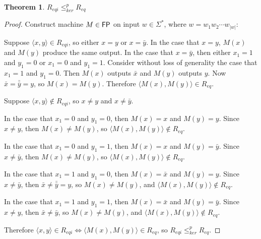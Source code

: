 \documentclass{article}
\newtheorem{theorem}{Theorem}[section]
\theoremstyle{definition} \newtheorem{definition}[definition]{Definition}
\newcommand{\sigmastar}{\Sigma^{*}} %
\newcommand{\kr}{\leq^{p}_{ker}} %
\newcommand{\pair}[2]{\langle#1,#2\rangle} %
\begin{document}
\begin{theorem}\label{thm:reqi_req}$R_{eqi}\kr R_{eq}$\end{theorem}
\begin{proof}
  Construct machine $M\in{\ensuremath{\mathsf{FP}}}$ on input $w\in\sigmastar$, where
  $w=w_1w_2\cdots w_{|w|}$:\\
  \begin{algorithm}[H]
  \end{algorithm}
  
  Suppose $\pair{x}{y}\in R_{eqi}$, so either $x=y$ or $x=\bar{y}$. In the case
  that $x=y$, $M(x)$ and $M(y)$ produce the same output. In the case that
  $x=\bar{y}$, then either $x_1=1$ and $y_1=0$ or $x_1=0$ and $y_1=1$. Consider
  without loss of generality the case that $x_1=1$ and $y_1=0$. Then $M(x)$
  outputs $\bar{x}$ and $M(y)$ outputs $y$. Now $\bar{x}=\bar{\bar{y}}=y$, so
  $M(x)=M(y)$. Therefore $\pair{M(x)}{M(y)}\in R_{eq}$.

  Suppose $\pair{x}{y}\notin R_{eqi}$, so $x\neq y$ and $x\neq\bar{y}$. 

  In the case that $x_1=0$ and $y_1=0$, then $M(x)=x$ and $M(y)=y$. Since
  $x\neq y$, then $M(x)\neq M(y)$, so $\pair{M(x)}{M(y)}\notin R_{eq}$.

  In the case that $x_1=0$ and $y_1=1$, then $M(x)=x$ and $M(y)=\bar{y}$. Since
  $x\neq\bar{y}$, then $M(x)\neq M(y)$, so $\pair{M(x)}{M(y)}\notin R_{eq}$.

  In the case that $x_1=1$ and $y_1=0$, then $M(x)=\bar{x}$ and $M(y)=y$. Since
  $x\neq\bar{y}$, then $\bar{x}\neq \bar{\bar{y}}=y$, so $M(x)\neq M(y)$, and
  $\pair{M(x)}{M(y)}\notin R_{eq}$. 

  In the case that $x_1=1$ and $y_1=1$, then $M(x)=\bar{x}$ and
  $M(y)=\bar{y}$. Since $x\neq y$, then $\bar{x}\neq\bar{y}$, so $M(x)\neq
  M(y)$, and $\pair{M(x)}{M(y)}\notin R_{eq}$.

  Therefore $\pair{x}{y}\in R_{eqi}\iff \pair{M(x)}{M(y)}\in R_{eq}$, so
  $R_{eqi}\kr R_{eq}$.
\end{proof}
\end{document}
